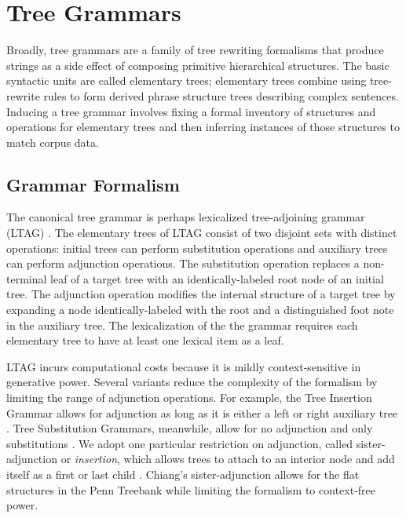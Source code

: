 \documentclass[11pt]{article}
\begin{document}
\section{Tree Grammars}
\label{sec:tree}

Broadly, tree grammars are a family of tree rewriting formalisms that
produce strings as a side effect of composing primitive
hierarchical structures.  The basic syntactic units are called
elementary trees; elementary trees combine using tree-rewrite rules to
form derived phrase structure trees describing complex sentences.
Inducing a tree grammar involves fixing a formal inventory of
structures and operations for elementary trees and then inferring
instances of those structures to match corpus data.

\subsection{Grammar Formalism}

The canonical tree grammar is perhaps lexicalized tree-adjoining
grammar (LTAG) \cite{joshi1991tree}.
%
The elementary trees of LTAG consist of two disjoint sets with
distinct operations: initial trees can perform substitution operations
and auxiliary trees can perform adjunction operations.
%
The substitution operation replaces a non-terminal leaf of a target
tree with an identically-labeled root node of an initial tree.
%
The adjunction operation modifies the internal structure of a target
tree by expanding a node identically-labeled with the root and a
distinguished foot note in the auxiliary tree.
%
The lexicalization of the the grammar requires each elementary tree to
have at least one lexical item as a leaf.

LTAG incurs computational costs because it is mildly context-sensitive
in generative power.
%
Several variants reduce the complexity of the formalism by limiting
the range of adjunction operations.
%
For example, the Tree Insertion Grammar allows for adjunction as long as it is either a left or right auxiliary tree \cite{Schabes1995}.
%
Tree Substitution Grammars, meanwhile, allow for no adjunction and
only substitutions \cite{cohn2009inducing}.
%
We adopt one particular restriction on adjunction, called
sister-adjunction or \emph{insertion}, which allows trees to attach to
an interior node and add itself as a first or last child
\cite{chiang2000statistical}.
%
Chiang's sister-adjunction allows for the flat structures in
the Penn Treebank while limiting the formalism to context-free power.
\end{document}
